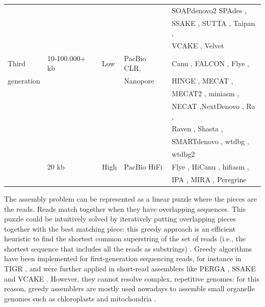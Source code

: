 \begin{table}
\begin{tabular}{|l|l|l|l|l|}
        &  &  &  & SOAPdenovo2 \cite{soapdenovo2} SPAdes \cite{spades}, \\
        &  &  &  & SSAKE \cite{ssake}, SUTTA \cite{sutta}, Taipan \cite{taipan}, \\
        &  &  &  & VCAKE \cite{vcake}, Velvet \cite{velvet} \\
    \hline
    Third & 10-100.000+ kb & Low & PacBio CLR, & Canu \cite{canu}, FALCON \cite{falcon-unzip}, Flye \cite{flye}, \\
    generation &  &  & Nanopore & HINGE \cite{hinge}, MECAT \cite{mecat}, \\
        &  &  &  & MECAT2 \cite{mecat}, miniasm \cite{miniasm}, \\
        &  &  &  & NECAT \cite{necat},NextDenovo \cite{nextdenovo}, Ra \cite{ra}, \\
        &  &  &  & Raven \cite{raven}, Shasta \cite{shasta}, \\
        &  &  &  & SMARTdenovo \cite{smartdenovo}, wtdbg \cite{wtdbg}, \\
        &  &  &  & wtdbg2 \cite{wtdbg2} \\
        & 20 kb & High & PacBio HiFi & Flye \cite{flye}, HiCanu \cite{hicanu}, hifiasm \cite{hifiasm}, \\ 
        &  &  &  & IPA \cite{IPA}, MIRA \cite{mira}, Peregrine \cite{peregrine}\\
    \hline
\end{tabular}
\label{tab:sequencing}
\end{table}


The assembly problem can be represented as a linear puzzle where the pieces are the reads. Reads match together when they have overlapping sequences. This puzzle could be intuitively solved by iteratively putting overlapping pieces together with the best matching piece: this greedy approach is an efficient heuristic to find the shortest common superstring of the set of reads (i.e., the shortest sequence that includes all the reads as substrings) \cite{greedy}. Greedy algorithms have been implemented for first-generation sequencing reads, for instance in TIGR \cite{tigr}, and were further applied in short-read assemblers like PERGA \cite{perga}, SSAKE \cite{ssake} and VCAKE \cite{vcake}. However, they cannot resolve complex, repetitive genomes: for this reason, greedy assemblers are mostly used nowadays to assemble small organelle genomes such as chloroplasts and mitochondria \cite{novoplasty}. \\

